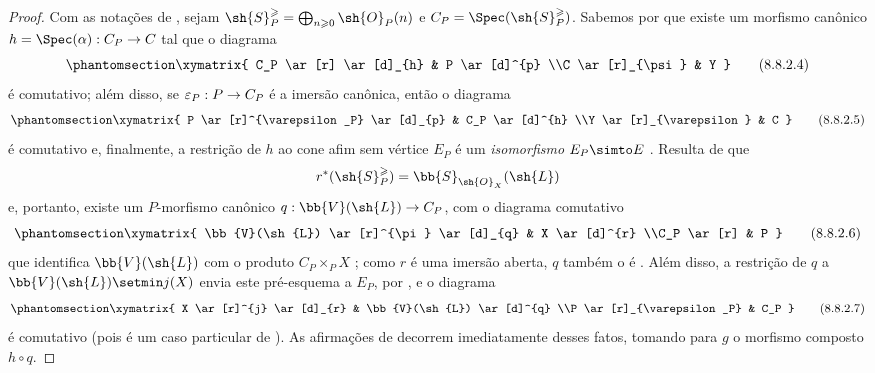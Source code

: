 \documentclass[oneside,10pt]{amsart}
\makeatletter
\renewcommand{\geq}{\geqslant}
\newcommand{\ega@arrow}[2]{\mathchoice{#1}{#2}{#2}{#2}}
\renewcommand{\to}{\ega@arrow{\longrightarrow}{\rightarrow}}
\newcommand{\oldpage}[2][]{\marginnote{\normalfont\footnotesize\textbf{#1}~|~#2}\ignorespaces}
\let\EGAOriginalLabel\label
\renewcommand{\label}[1]{\phantomsection\EGAOriginalLabel{#1}}
\newcommand*{\ega@labelnumber}[1]{\StrBehind{#1}{.}}
\newcommand{\eref}[1]{\hyperref[#1]{\normalfont{(\ega@labelnumber{#1})}}}
\makeatother
\begin{document}
\begin{proof}
Com as notações de , sejam $\sh{S}_P^\geq = \bigoplus_{n\geq0}\sh{O}_P(n)$ e $C_P=\Spec(\sh{S}_P^\geq)$.
Sabemos por  que existe um morfismo canônico $h=\Spec(\alpha):C_P\to C$ tal que o diagrama
\[
\label{II.8.8.2.4}
  \xymatrix{
    C_P
      \ar[r]
      \ar[d]_{h}
  & P
      \ar[d]^{p}
  \\C
      \ar[r]_{\psi}
  & Y
  }
\tag{8.8.2.4}
\]
é comutativo; além disso, se $\varepsilon_P:P\to C_P$ é a imersão canônica, então o diagrama
\[
\label{II.8.8.2.5}
  \xymatrix{
    P
      \ar[r]^{\varepsilon_P}
      \ar[d]_{p}
  & C_P
      \ar[d]^{h}
  \\Y
      \ar[r]_{\varepsilon}
  & C
  }
\tag{8.8.2.5}
\]
é comutativo  e, finalmente, a restrição de $h$ ao cone afim sem vértice $E_P$ é um \emph{isomorfismo} $E_P\simto E$ .
Resulta de  que
\[
  r^*(\sh{S}_P^\geq)=\bb{S}_{\sh{O}_X}(\sh{L})
\]
\oldpage[II]{179}
e, portanto, existe um $P$-morfismo canônico $q:\bb{V}(\sh{L})\to C_P$, com o diagrama comutativo
\[
\label{II.8.8.2.6}
  \xymatrix{
    \bb{V}(\sh{L})
      \ar[r]^{\pi}
      \ar[d]_{q}
  & X
      \ar[d]^{r}
  \\C_P
      \ar[r]
  & P
  }
\tag{8.8.2.6}
\]
que identifica $\bb{V}(\sh{L})$ com o produto $C_P\times_P X$ ;
como $r$ é uma imersão aberta, $q$ também o é .
Além disso, a restrição de $q$ a $\bb{V}(\sh{L})\setmin j(X)$ envia este pré-esquema a $E_P$, por , e o diagrama
\[
\label{II.8.8.2.7}
  \xymatrix{
    X
      \ar[r]^{j}
      \ar[d]_{r}
  & \bb{V}(\sh{L})
      \ar[d]^{q}
  \\P
      \ar[r]_{\varepsilon_P}
  & C_P
  }
\tag{8.8.2.7}
\]
é comutativo (pois é um caso particular de \eref{eq:2.8.5.1.3}).
As afirmações de  decorrem imediatamente desses fatos, tomando para $g$ o morfismo composto $h\circ q$.
\end{proof}
\end{document}
